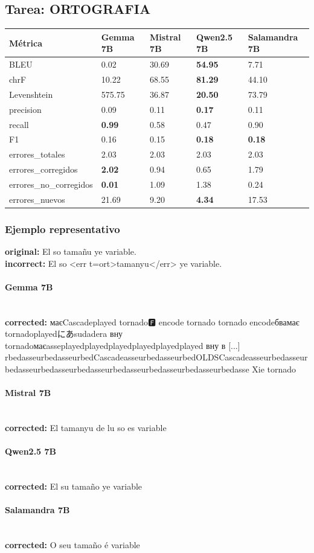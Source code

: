 \subsection{Tarea: ORTOGRAFIA}\label{tarea-ortografia}
{\def\LTcaptype{none}
\begin{longtable}[]{@{}lllll@{}}
\toprule\noalign{}
Métrica & Gemma 7B & Mistral 7B & Qwen2.5 7B & Salamandra 7B \\
\midrule\noalign{}
\endhead
\bottomrule\noalign{}
\endlastfoot
BLEU & 0.02 & 30.69 & \textbf{54.95} & 7.71 \\
chrF & 10.22 & 68.55 & \textbf{81.29} & 44.10 \\
Levenshtein & 575.75 & 36.87 & \textbf{20.50} & 73.79 \\
precision & 0.09 & 0.11 & \textbf{0.17} & 0.11 \\
recall & \textbf{0.99} & 0.58 & 0.47 & 0.90 \\
F1 & 0.16 & 0.15 & \textbf{0.18} & \textbf{0.18} \\
errores\_totales & 2.03 & 2.03 & 2.03 & 2.03 \\
errores\_corregidos & \textbf{2.02} & 0.94 & 0.65 & 1.79 \\
errores\_no\_corregidos & \textbf{0.01} & 1.09 & 1.38 & 0.24 \\
errores\_nuevos & 21.69 & 9.20 & \textbf{4.34} & 17.53 \\
\end{longtable}}

\subsubsection{Ejemplo representativo}
\textbf{original:} El so tamañu ye variable.\\
\textbf{incorrect:} El so {\textless}err t=ort{\textgreater}tamanyu{\textless}/err{\textgreater} ye variable.\\

\paragraph{Gemma 7B}~\\
\textbf{corrected:} маєCascadeplayed tornado🅵 encode tornado tornado encodeбвамає tornadoplayedにあsudadera вну tornadoмаєasseplayedplayedplayedplayedplayedplayed вну в [...] rbedasseurbedasseurbedCascadeasseurbedasseurbedOLDSCascadeasseurbedasseurbedasseurbedasseurbedasseurbedasseurbedasseurbedasseurbedasse Xie tornado\\

\paragraph{Mistral 7B}~\\
\textbf{corrected:} El tamanyu de lu so es variable\\

\paragraph{Qwen2.5 7B}~\\
\textbf{corrected:} El su tamaño ye variable\\

\paragraph{Salamandra 7B}~\\
\textbf{corrected:} O seu tamaño é variable\\